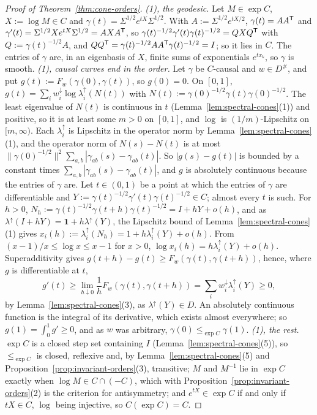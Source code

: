 \begin{proof}[Proof of Theorem~\ref{thm:cone-orders}]
\emph{(1), the geodesic.} Let $M \in \exp C$, $X := \log M \in C$ and $\gamma(t) = \Sigma^{1/2}e^{tX}\Sigma^{1/2}$.
With $A := \Sigma^{1/2}e^{tX/2}$, $\gamma(t) = AA^{\mathsf{T}}$ and $\gamma'(t) = \Sigma^{1/2}Xe^{tX}\Sigma^{1/2} =
AXA^{\mathsf{T}}$, so $\gamma(t)^{-1/2}\gamma'(t)\gamma(t)^{-1/2} = QXQ^{\mathsf{T}}$ with $Q := \gamma(t)^{-1/2}A$, and
$QQ^{\mathsf{T}} = \gamma(t)^{-1/2}AA^{\mathsf{T}}\gamma(t)^{-1/2} = I$; so it lies in $C$. The entries of $\gamma$ are, in an
eigenbasis of $X$, finite sums of exponentials $e^{tx_k}$, so $\gamma$ is smooth.
\emph{(1), causal curves end in the order.} Let $\gamma$ be $C$-causal and $w \in D^\#$, and put
$g(t) := F_w(\gamma(0), \gamma(t))$, so $g(0) = 0$. On $[0,1]$, $g(t) = \sum_iw^\downarrow_i\log
\lambda^\uparrow_i(N(t))$ with $N(t) := \gamma(0)^{-1/2}\gamma(t)\gamma(0)^{-1/2}$. The least eigenvalue of
$N(t)$ is continuous in $t$ (Lemma~\ref{lem:spectral-cones}(1)) and positive, so it is at least some $m > 0$ on
$[0,1]$, and $\log$ is $(1/m)$-Lipschitz on $[m, \infty)$. Each $\lambda^\uparrow_i$ is Lipschitz in the
operator norm by Lemma~\ref{lem:spectral-cones}(1), and the operator norm of $N(s) - N(t)$ is at most
$\|\gamma(0)^{-1/2}\|^2\sum_{a,b}|\gamma_{ab}(s) - \gamma_{ab}(t)|$. So $|g(s) - g(t)|$ is bounded by a
constant times $\sum_{a,b}|\gamma_{ab}(s) - \gamma_{ab}(t)|$, and $g$ is absolutely continuous because the
entries of $\gamma$ are. Let $t \in (0,1)$ be a point at which the entries of $\gamma$ are differentiable and
$Y := \gamma(t)^{-1/2}\gamma'(t)\gamma(t)^{-1/2} \in C$; almost every $t$ is such. For $h > 0$,
$N_h := \gamma(t)^{-1/2}\gamma(t+h)\gamma(t)^{-1/2} = I + hY + o(h)$, and as $\lambda^\uparrow(I + hY) =
\mathbf 1 + h\lambda^\uparrow(Y)$, the Lipschitz bound of Lemma~\ref{lem:spectral-cones}(1) gives
$x_i(h) := \lambda^\uparrow_i(N_h) = 1 + h\lambda^\uparrow_i(Y) + o(h)$. From $(x - 1)/x \le \log x \le x - 1$
for $x > 0$, $\log x_i(h) = h\lambda^\uparrow_i(Y) + o(h)$. Superadditivity gives
$g(t+h) - g(t) \ge F_w(\gamma(t), \gamma(t+h))$, hence, where $g$ is differentiable at $t$,
\[
  g'(t) \ge \lim_{h\downarrow0}\frac1hF_w(\gamma(t), \gamma(t+h)) = \sum_iw^\downarrow_i\lambda^\uparrow_i(Y) \ge 0 ,
\]
by Lemma~\ref{lem:spectral-cones}(3), as $\lambda^\uparrow(Y) \in D$. An absolutely continuous function is the
integral of its derivative, which exists almost everywhere; so $g(1) = \int_0^1g' \ge 0$, and as $w$ was
arbitrary, $\gamma(0) \le_{\exp C} \gamma(1)$. \emph{(1), the rest.} $\exp C$ is a closed step set
containing $I$ (Lemma~\ref{lem:spectral-cones}(5)), so $\le_{\exp C}$ is closed, reflexive and, by
Lemma~\ref{lem:spectral-cones}(5) and Proposition~\ref{prop:invariant-orders}(3), transitive; $M$ and $M^{-1}$ lie in
$\exp C$ exactly when $\log M \in C \cap (-C)$, which with Proposition~\ref{prop:invariant-orders}(2) is the criterion
for antisymmetry; and $e^{tX} \in \exp C$ if and only if $tX \in C$, $\log$ being injective, so
$C(\exp C) = C$.


\end{proof}
